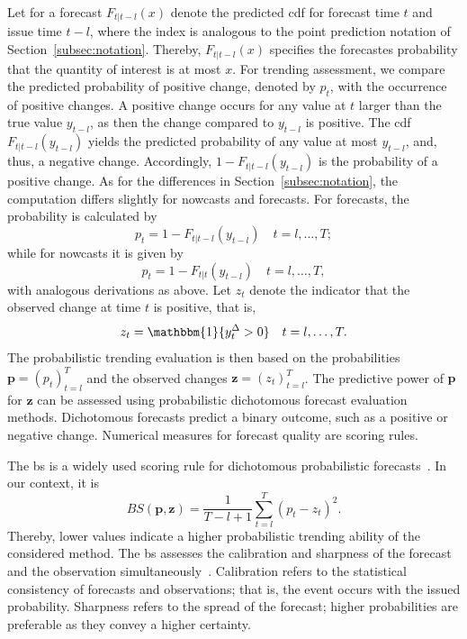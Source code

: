 \documentclass[pdflatex]{sn-jnl}
\theoremstyle{plain}%
\theoremstyle{definition}
\newcommand{\ind}[1]{\mathbbm{1}\{#1\}}
\newcommand{\diffyt}[1][t]{y^{\Delta}_{#1}}
\begin{document}
Let for a forecast $F_{t | t-l} (x)$ denote the predicted \ac{cdf} for forecast time $t$ and issue time $t - l$, where the index is analogous to the point prediction notation of Section~\ref{subsec:notation}.
Thereby, $F_{t | t-l} (x)$ specifies the forecastes probability that the quantity of interest is at most $x$.
For trending assessment, we compare the predicted probability of positive change, denoted by $p_t$, with the occurrence of positive changes.
A positive change occurs for any value at $t$ larger than the true value $y_{t-l}$, as then the change compared to $y_{t-l}$ is positive.
The \ac{cdf} $F_{t | t-l} (y_{t-l})$ yields the predicted probability of any value at most $y_{t-l}$, and, thus, a negative change.
Accordingly, $1 - F_{t | t-l} (y_{t-l})$ is the probability of a positive change.
As for the differences in Section~\ref{subsec:notation}, the computation differs slightly for nowcasts and forecasts.
For forecasts, the probability is calculated by
\begin{equation*}
    p_t = 1 - F_{t | t-l} (y_{t-l})\quad t = l, \dots, T;
\end{equation*}
while for nowcasts it is given by
\begin{equation*}
    p_t = 1 - F_{t | t} (y_{t-l})\quad t = l, \dots, T,
\end{equation*}
with analogous derivations as above.
Let $z_t$ denote the indicator that the observed change at time $t$ is positive, that is,
\begin{equation*}
    z_t = \ind{\diffyt > 0} \quad t = l, \dots, T.
\end{equation*}
The probabilistic trending evaluation is then based on the probabilities $\mathbf{p} = (p_t)_{t=l}^{T}$ and the observed changes $\mathbf{z} = (z_t)_{t=l}^{T}$.
The predictive power of $\mathbf{p}$ for $\mathbf{z}$ can be assessed using probabilistic dichotomous forecast evaluation methods.
Dichotomous forecasts predict a binary outcome, such as a positive or negative change.
Numerical measures for forecast quality are scoring rules.

The \ac{bs} is a widely used scoring rule for dichotomous probabilistic forecasts~\citep{Brier1950}.
In our context, it is
\begin{equation*}
    BS (\mathbf{p}, \mathbf{z}) = \frac{1}{T-l+1} \sum_{t=l}^{T} (p_t - z_t)^2.
\end{equation*}
Thereby, lower values indicate a higher probabilistic trending ability of the considered method.
The \ac{bs} assesses the calibration and sharpness of the forecast and the observation simultaneously~\citep{Ranjan2010,Mitchell2011}.
Calibration refers to the statistical consistency of forecasts and observations; that is, the event occurs with the issued probability.
Sharpness refers to the spread of the forecast; higher probabilities are preferable as they convey a higher certainty.
\end{document}
